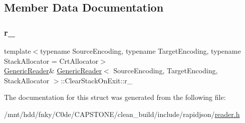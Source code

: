 \subsection{Member Data Documentation}
\mbox{\label{structGenericReader_1_1ClearStackOnExit_a6805ebb172f278c65ec7fc61847eb08d}} 
\subsubsection{\texorpdfstring{r\+\_\+}{r\_}}
{\footnotesize\ttfamily template$<$typename Source\+Encoding, typename Target\+Encoding, typename Stack\+Allocator = Crt\+Allocator$>$ \\
\hyperlink{classGenericReader}{Generic\+Reader}\& \hyperlink{classGenericReader}{Generic\+Reader}$<$ Source\+Encoding, Target\+Encoding, Stack\+Allocator $>$\+::Clear\+Stack\+On\+Exit\+::r\+\_\+\hspace{0.3cm}{\ttfamily [private]}}



The documentation for this struct was generated from the following file\+:\begin{DoxyCompactItemize}
\item 
/mnt/hdd/fnky/\+C0de/\+C\+A\+P\+S\+T\+O\+N\+E/clean\+\_\+build/include/rapidjson/\hyperlink{reader_8h}{reader.\+h}\end{DoxyCompactItemize}
